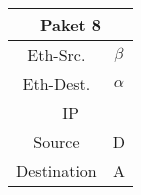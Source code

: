 \begin{table}[p]
\begin{minipage}[t]{0.32\linewidth}
        \caption{}
        \label{tab:4.12.7}
    \end{minipage}
    \begin{minipage}[t]{0.32\linewidth}
        \centering
        \begin{tabular}{|c|c|}
            \hline
            \multicolumn{2}{|c|}{Paket 8} \\
            \hline
            Eth-Src.  & $\beta$ \\
            \hline
            Eth-Dest. & $\alpha$ \\
            \hline
            \multicolumn{2}{|c|}{IP} \\
            \hline
            Source & D \\
            \hline
            Destination & A \\
            \hline
        \end{tabular}
        \caption{}
        \label{tab:4.12.8}
    \end{minipage}
\end{table}

\FloatBarrier
